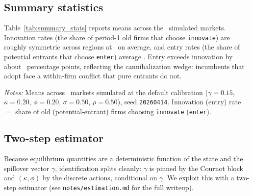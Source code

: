 \documentclass[12pt]{article}
\begin{document}
\subsection{Summary statistics}

Table~\ref{tab:summary_stats} reports means across the \SummaryNMarkets\
simulated markets. Innovation rates (the share of period-1 old firms that
choose \texttt{innovate}) are roughly symmetric across regions at
\InnovRateTotal\ on average, and entry rates (the share of potential
entrants that choose \texttt{enter}) average \EntryRateTotal. Entry
exceeds innovation by about \EntryInnovGapPP\ percentage points,
reflecting the cannibalization wedge: incumbents that adopt face a
within-firm conflict that pure entrants do not.\\

\begin{table}[ht]
  \centering
  \begin{threeparttable}
    \caption{Summary statistics --- simulated panel (\SummaryNMarkets\ markets)}
    \medskip
    \label{tab:summary_stats}
    
    \begin{tablenotes}[flushleft]
      \footnotesize
      \item[] \textit{Notes:} Means across \SummaryNMarkets\ markets
        simulated at the default calibration ($\gamma = 0.15$,
        $\kappa = 0.20$, $\phi = 0.20$, $\sigma = 0.50$, $\rho = 0.50$),
        seed \texttt{20260414}. Innovation (entry) rate $=$ share of
        old (potential-entrant) firms choosing \texttt{innovate}
        (\texttt{enter}).
    \end{tablenotes}
  \end{threeparttable}
\end{table}

\subsection{Two-step estimator}

Because equilibrium quantities are a deterministic function of the state
and the spillover vector $\gamma$, identification splits cleanly: $\gamma$
is pinned by the Cournot block and $(\kappa, \phi)$ by the discrete
actions, conditional on $\gamma$. We exploit this with a two-step estimator
(see \texttt{notes/estimation.md} for the full writeup).
\end{document}
